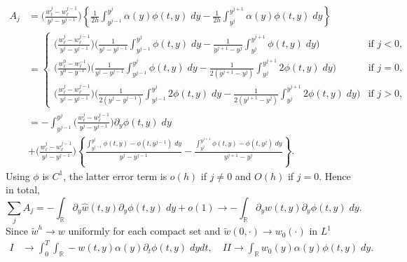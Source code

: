 \documentclass[a4paper,11pt]{article}
\theoremstyle{remark}
\begin{document}
\begin{align*}
 A_j &= \Big(\tfrac{w^{j}_{\ell} - w^{j-1}_{\ell}}{y^{j}-y^{j-1}}\Big)
        \left\{\frac{1}{2h}\int_{y^{j-1}}^{y^{j}} \alpha(y)\phi(t,y) \; dy -  \frac{1}{2h}\int_{y^{j}}^{y^{j+1}} \alpha(y)\phi(t,y) \; dy\right\}\\
     &= \left\{\begin{array}{ll} 
        \Big(\tfrac{w^{j}_{\ell} - w^{j-1}_{\ell}}{y^{j}-y^{j-1}}\Big)
        \bigg( \frac{1}{y^j-y^{j-1}}\int_{y^{j-1}}^{y^{j}} \phi(t,y) \; dy- \frac{1}{y^{j+1}-y^{j}}\int_{y^{j}}^{y^{j+1}} \phi(t,y) \; dy \bigg) & \text{if } j<0,\\
        \Big(\tfrac{w^{0}_{\ell} - w^{-1}_{\ell}}{y^{0}-y^{-1}}\Big)
        \bigg( \frac{1}{y^j-y^{j-1}}\int_{y^{j-1}}^{y^{j}} \phi(t,y) \; dy- \frac{1}{2(y^{j+1}-y^{j})}\int_{y^{j}}^{y^{j+1}} 2\phi(t,y) \; dy \bigg) & \text{if } j=0,\\
        \Big(\tfrac{w^{j}_{\ell} - w^{j-1}_{\ell}}{y^{j}-y^{j-1}}\Big)
        \bigg( \frac{1}{2(y^j-y^{j-1})}\int_{y^{j-1}}^{y^{j}} 2\phi(t,y) \; dy- \frac{1}{2(y^{j+1}-y^{j})}\int_{y^{j}}^{y^{j+1}} 2\phi(t,y) \; dy \bigg) & \text{if } j>0,        
       \end{array}\right.\\
     &=-\int_{y^{j-1}}^{y^{j}}\Big(\tfrac{w^{j}_{\ell} - w^{j-1}_{\ell}}{y^{j}-y^{j-1}}\Big)\partial_y\phi(t,y)\;dy \\
     & + \Big(\tfrac{w^{j}_{\ell} - w^{j-1}_{\ell}}{y^{j}-y^{j-1}}\Big)\left\{
        \frac{\int_{y^{j-1}}^{y^{j}} \phi(t,y)-\phi(t,y^{j-1}) \; dy}{y^j-y^{j-1}} - \frac{\int_{y^{j}}^{y^{j+1}} \phi(t,y)-\phi(t,y^{j}) \; dy}{y^{j+1}-y^j} \right\}.
\end{align*}
Using $\phi$ is $C^1$, the latter error term is $o(h)$ if $j\ne0$ and $O(h)$ if $j=0$. Hence in total,
$$\sum_j  A_j = -\int_\mathbb{R} \partial_y \hat{w}(t,y) \partial_y \phi(t,y) \; dy + o(1) \rightarrow -\int_\mathbb{R} \partial_y w(t,y) \partial_y \phi(t,y) \; dy.$$
Since $\tilde{w}^h \rightarrow w$ uniformly for each compact set and $\tilde{w}(0,\cdot) \rightarrow w_0(\cdot)$ in $L^1$
\begin{align*}
I &\rightarrow \int_0^T\int_\mathbb{R} -w(t,y) \alpha(y)\partial_t\phi(t,y)\; dy dt, \quad 
II \rightarrow \int_\mathbb{R} w_0(y)\alpha(y)\phi(t,y) \; dy. 
\end{align*}
\end{document}

